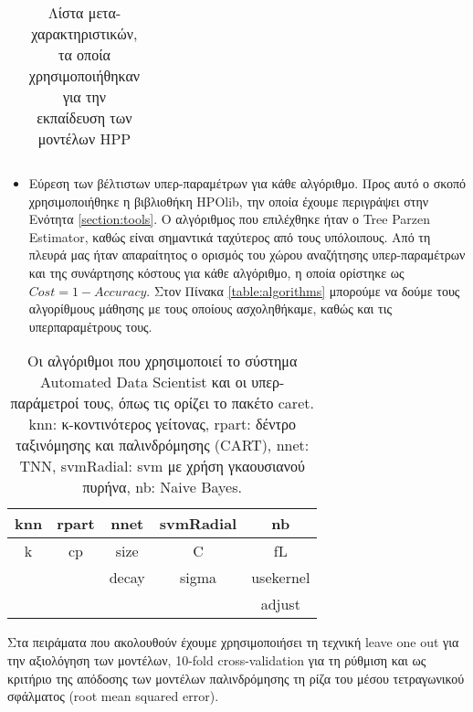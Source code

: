\begin{itemize}
\begin{table}[!htb]
\begin{center}
\begin{tabular}{ |c| }
	 			\hline
	 		\end{tabular}    
	 	\end{center}
	 	\caption{Λίστα μετα-χαρακτηριστικών, τα οποία χρησιμοποιήθηκαν για την εκπαίδευση των μοντέλων HPP}\label{table:meta}
	 \end{table}
	\item Εύρεση των βέλτιστων υπερ-παραμέτρων για κάθε αλγόριθμο. Προς αυτό ο σκοπό χρησιμοποιήθηκε η βιβλιοθήκη HPOlib, την οποία έχουμε περιγράψει στην Eνότητα \ref{section:tools}. Ο αλγόριθμος που επιλέχθηκε ήταν ο Tree Parzen Estimator, καθώς είναι σημαντικά ταχύτερος από τους υπόλοιπους. Από τη πλευρά μας ήταν απαραίτητος ο ορισμός του χώρου αναζήτησης υπερ-παραμέτρων και της συνάρτησης κόστους για κάθε αλγόριθμο, η οποία ορίστηκε ως $ Cost = 1- Accuracy$. Στον Πίνακα \ref{table:algorithms} μπορούμε να δούμε τους αλγορίθμους μάθησης με τους οποίους ασχοληθήκαμε, καθώς και τις υπερπαραμέτρους τους.	

\end{itemize}
	\begin{table}[!htb]
		\begin{center}
			\begin{tabular}{ |c|c|c|c|c| } 
				\hline
				knn & rpart & nnet & svmRadial & nb\\
				\hline
			    k & cp & size& C & fL\\
			     &  & decay& sigma & usekernel \\
			     &  &    & & adjust \\
				\hline
			\end{tabular}    
		\end{center}
		\label{table:algorithms}
		\caption{Οι αλγόριθμοι που χρησιμοποιεί το σύστημα Automated Data Scientist και οι υπερ-παράμετροί τους, όπως τις ορίζει το πακέτο caret. knn: κ-κοντινότερος γείτονας, rpart: δέντρο ταξινόμησης και παλινδρόμησης (CART), nnet: ΤΝΝ, svmRadial: svm με χρήση γκαουσιανού πυρήνα, nb: Naive Bayes.} \label{table:meta}
	\end{table} 
	
Στα πειράματα που ακολουθούν έχουμε χρησιμοποιήσει τη τεχνική leave one out για την αξιολόγηση των μοντέλων, 10-fold cross-validation για τη ρύθμιση και ως κριτήριο της απόδοσης των μοντέλων παλινδρόμησης τη ρίζα του μέσου τετραγωνικού σφάλματος (root mean squared error).

